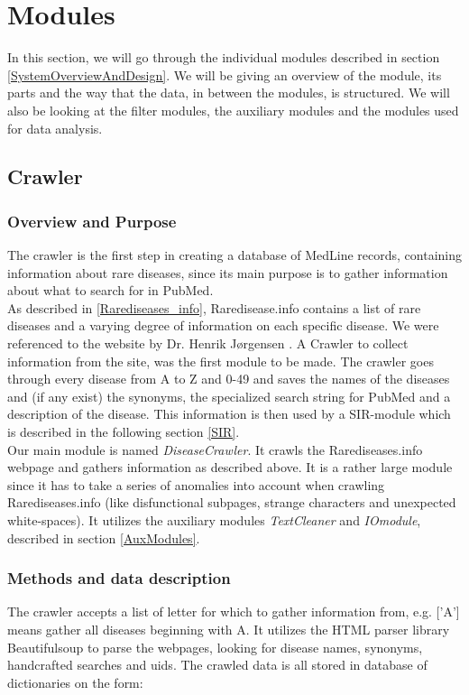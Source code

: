 \section{Modules}

In this section, we will go through the individual modules described
in section \ref{SystemOverviewAndDesign}. We will be giving an
overview of the module, its parts and the way that the data, in
between the modules, is structured. We will also be looking at the
filter modules, the auxiliary modules and the modules used for data
analysis.

\subsection{Crawler\label{Crawler}}

\subsubsection{Overview and Purpose}
The crawler is the first step in creating a database of MedLine
records, containing information about rare diseases, since its main
purpose is to gather information about what to search for in PubMed.\\

As described in \ref{Rarediseases_info}, Raredisease.info contains a
list of rare diseases and a varying degree of information on each
specific disease. We were referenced to the website by Dr. Henrik
Jørgensen \cite{TheDude}. A Crawler to collect information from the
site, was the first module to be made. The crawler goes through every
disease from A to Z and 0-49 and saves the names of the diseases and
(if any exist) the synonyms, the specialized search string for PubMed
and a description of the disease. This information is then used by a
SIR-module which is described in the following section \ref{SIR}.\\

Our main module is named \textit{DiseaseCrawler}. It crawls the
Rarediseases.info webpage and gathers information as described
above. It is a rather large module since it has to take a series of
anomalies into account when crawling Rarediseases.info (like
disfunctional subpages, strange characters and unexpected
white-spaces). It utilizes the auxiliary modules \textit{TextCleaner}
and \textit{IOmodule}, described in section \ref{AuxModules}.\\


\subsubsection{Methods and data description}
The crawler accepts a list of letter for which to gather information
from, e.g. ['A'] means gather all diseases beginning with A. It
utilizes the HTML parser library Beautifulsoup \cite{BS} to parse the
webpages, looking for disease names, synonyms, handcrafted searches
and uids. The crawled data is all stored in database of dictionaries
on the form:

